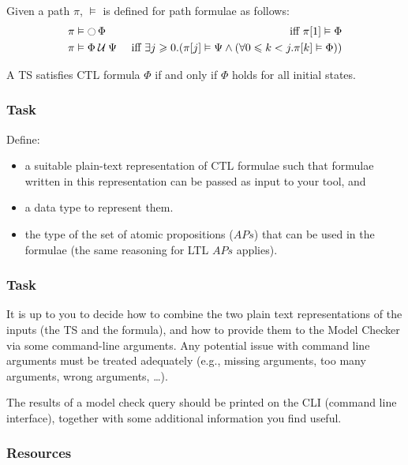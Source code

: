 \documentclass{article}
\begin{document}
Given a path $\pi$, $\vDash$ is defined for path formulae as follows: 
\begin{align*}
    & \pi \vDash \mathop{\ocircle}{\Phi} & \text{ iff } \pi[1]  \vDash \Phi \\ 
    & \pi \vDash \Phi \mathbin{\mathcal{U}} \Psi & \text{ iff } \exists j \geqslant 0. (\pi[j]  \vDash \Psi \land (\forall 0 \leqslant k < j. \pi[k]  \vDash \Phi))
\end{align*}

A TS satisfies CTL formula $\Phi$ if and only if $\Phi$ holds for all initial states.

\subsubsection*{Task}
Define:
\begin{itemize}
    \item a suitable plain-text representation of CTL formulae such that formulae written in this representation can be passed as input to your tool, and 
    \item a data type to represent them.
    \item the type of the set of atomic propositions ($APs$) that can be used in the formulae (the same reasoning for LTL $APs$ applies).
\end{itemize}

\subsubsection*{Task}
It is up to you to decide how to combine the two plain text representations of the inputs (the TS and the formula), and how to provide them to the Model Checker via some command-line arguments. Any potential issue with command line arguments must be treated adequately (e.g., missing arguments, too many arguments, wrong arguments, \dots).

The results of a model check query should be printed on the CLI (command line interface), together with some additional information you find useful.

\subsubsection*{Resources}
\cite[Paragraph 6.2 (in particular 6.1.1 and 6.1.2)]{BaKa}
\end{document}
